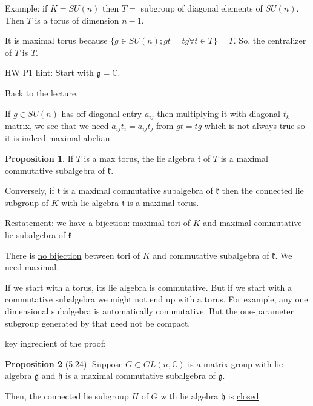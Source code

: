 \documentclass{article}
\theoremstyle{definition}
\newtheorem{proposition}{Proposition}
\begin{document}
Example: if \(K=SU(n)\) then \(T =\) subgroup of diagonal elements of \(SU(n)\). Then \(T\) is a torus of dimension \(n-1\).

It is maximal torus because \(\{ g\in SU(n); gt=tg  \forall t\in T \} = T\). So, the centralizer of \(T\) is \(T\).

HW P1 hint: Start with \(\mathfrak{g} = \mathbb{C}\).

Back to the lecture.

If \(g\in SU(n)\) has off diagonal entry \(a_{ij}\) then multiplying it with diagonal \(t_k\) matrix, we see that we need \(a_{ij}t_i=a_{ij}t_j\) from \(gt=tg\) which is not always true so it is indeed maximal abelian.

\begin{proposition}
    If \(T\) is a max torus, the lie algebra \(\mathfrak{t}\) of \(T\) is a maximal commutative subalgebra of \(\mathfrak{k}\).
    
    Conversely, if \(\mathfrak{t}\) is a maximal commutative subalgebra of \(\mathfrak{k}\) then the connected lie subgroup of \(K\) with lie algebra \(\mathfrak{t}\) is a maximal torus.     
\end{proposition}

\underline{Restatement}: we have a bijection: maximal tori of \(K\) and maximal commutative lie subalgebra of \(\mathfrak{k}\)  

There is \underline{no bijection} between tori of \(K\) and commutative subalgebra of \(\mathfrak{k}\). We need maximal.

If we start with a torus, its lie algebra is commutative. But if we start with a commutative subalgebra we might not end up with a torus. For example, any one dimensional subalgebra is automatically commutative. But the one-parameter subgroup generated by that need not be compact.

key ingredient of the proof:

\begin{proposition}
    [5.24] Suppose \(G \subset GL(n,\mathbb{C})\) is a matrix group with lie algebra \(\mathfrak{g}\) and \(\mathfrak{h}\) is a maximal commutative subalgebra of \(\mathfrak{g}\). 
    
    Then, the connected lie subgroup \(H\) of \(G\) with lie algebra \(\mathfrak{h}\) is \underline{closed}. 
\end{proposition}
\end{document}
